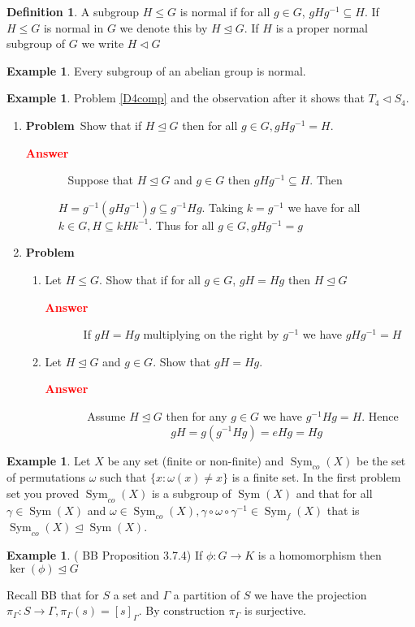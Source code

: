 \documentclass[12pt]{amsart}
\newcommand{\benu}{\begin{enumerate}}
\newcommand{\eenu}{\end{enumerate}}
\theoremstyle{definition}
\newtheorem{definition}[theorem]{Definition}
\newcommand{\bdf}{\begin{definition}}
\newcommand{\edf}{\end{definition}}
\newtheorem{example}[theorem]{Example}
\newcommand{\bax}{\begin{example}}
\newcommand{\ax}{\end{example}}
\DeclareMathOperator{\Sym}{Sym}
\newcommand{\itep}{\item {\bfseries Problem}\ }
\newcommand{\beans}{\begin{description} \item[{ \bfseries \textcolor{red}{Answer}}]\ }
\newcommand{\eans }{\end{description}}
\begin{document}
\bdf A subgroup $H\leq G$ is normal if for all $g\in G$, $gHg^{-1}\subseteq H$. If $H\leq G$ is normal in $G$ we denote this by $H\unlhd G$. If $H$ is a proper normal subgroup of $G$ we write $H\lhd G$
\edf
\bax Every subgroup of an abelian group is normal.
\ax
\bax Problem \ref{D4comp} and the observation after it shows that $T_4\lhd S_4$.
\ax
\begin{enumerate}[resume=p]
\itep  Show that if $H\unlhd G$ then for all $g\in G, gHg^{-1}=H$.
\beans
Suppose that $H\unlhd G$ and $g\in G$ then $gHg^{-1}\subseteq H$. Then 

$H=g^{-1}(gHg^{-1})g\subseteq g^{-1}Hg$. Taking $k=g^{-1}$ we have for all $k\in G, H\subseteq kHk^{-1}$. Thus for all $g\in G,gHg^{-1}=g$

\eans
\itep 
\benu
\item Let $H\leq G$. Show that if for all $g\in G$, $gH=Hg$ then $H\unlhd G$
\beans If $gH=Hg$ multiplying on the right by $g^{-1}$ we have $gHg^{-1}=H$
\eans
\item Let $H\unlhd G$ and $g\in G$. Show that $gH=Hg$.  
\beans 
Assume $H\unlhd G$ then for any $g\in G$ we have $g^{-1}Hg=H$. Hence 
\[gH=g(g^{-1}Hg)=eHg=Hg
\]
\eans
\eenu
\end{enumerate}


\bax Let $X$ be any set (finite or non-finite) and $\Sym_{co}(X)$ be the set of permutations $\omega$ such that $\{x:\omega(x)\neq x\}$ is a finite set. In the first problem set you proved $\Sym_{co}(X)$ is a subgroup of $\Sym(X)$ and that for all $\gamma\in \Sym(X)$ and $\omega\in \Sym_{ co}(X),\gamma\circ \omega\circ \gamma^{-1}\in \Sym_{f}(X)$ that is $\Sym_{co}(X)\unlhd \Sym(X)$.
\ax

\bax ( BB Proposition  3.7.4) If $\phi\colon G\to K$ is a homomorphism then $\ker(\phi)\unlhd G$
\ax 

Recall BB that for $S$ a set and $\Gamma$ a partition of $S$ we have the  projection $\pi_\Gamma\colon S\to \Gamma,\pi_\Gamma(s)=[s]_\Gamma$. By construction $\pi_\Gamma$ is surjective.
\end{document}
